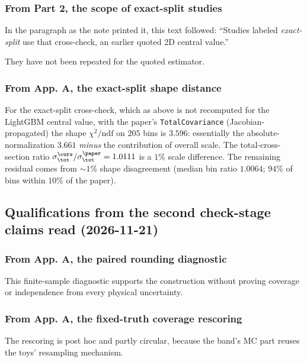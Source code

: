 \subsubsection{From Part 2, the scope of exact-split studies}
In the paragraph as the note printed it, this text followed: ``Studies labeled \emph{exact-split} use that cross-check, an earlier quoted 2D central value.''\par
They have not been repeated for the quoted estimator.

\subsubsection{From App. A, the exact-split shape distance}
For the exact-split cross-check, which as above is not recomputed for the LightGBM central value, with the paper's \texttt{TotalCovariance} (Jacobian-propagated) the shape $\chi^{2}/\mathrm{ndf}$ on $205$ bins is $\boxed{3.596}$: essentially the absolute-normalization $3.661$ \emph{minus} the contribution of overall scale. The total-cross-section ratio $\sigma_{\tot}^{\ours}/\sigma_{\tot}^{\paper} = 1.0111$ is a $1\%$ scale difference. The remaining residual comes from $\sim 1\%$ shape disagreement (median bin ratio $1.0064$; $94\%$ of bins within $10\%$ of the paper).

\subsection{Qualifications from the second check-stage claims read (2026-11-21)}

\subsubsection{From App. A, the paired rounding diagnostic}
This finite-sample diagnostic supports the construction without proving coverage or independence from every physical uncertainty.

\subsubsection{From App. A, the fixed-truth coverage rescoring}
The rescoring is post hoc and partly circular, because the band's MC part reuses the toys' resampling mechanism.
